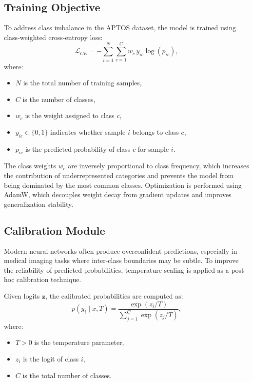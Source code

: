 \documentclass[conference]{IEEEtran}
\begin{document}
\subsection{Training Objective}
To address class imbalance in the APTOS dataset, the model is trained using class-weighted cross-entropy loss:
\begin{equation}
\mathcal{L}_{CE} = - \sum_{i=1}^{N} \sum_{c=1}^{C} w_c \, y_{ic} \log(p_{ic}),
\end{equation}
where:
\begin{itemize}
    \item $N$ is the total number of training samples,
    \item $C$ is the number of classes,
    \item $w_c$ is the weight assigned to class $c$,
    \item $y_{ic} \in \{0,1\}$ indicates whether sample $i$ belongs to class $c$,
    \item $p_{ic}$ is the predicted probability of class $c$ for sample $i$.
\end{itemize}

The class weights $w_c$ are inversely proportional to class frequency, which increases the contribution of underrepresented categories and prevents the model from being dominated by the most common classes. Optimization is performed using AdamW, which decouples weight decay from gradient updates and improves generalization stability.

\subsection{Calibration Module}
Modern neural networks often produce overconfident predictions, especially in medical imaging tasks where inter-class boundaries may be subtle. To improve the reliability of predicted probabilities, temperature scaling is applied as a post-hoc calibration technique.

Given logits $\mathbf{z}$, the calibrated probabilities are computed as:
\begin{equation}
p(y_i \mid x, T) = \frac{\exp(z_i/T)}{\sum_{j=1}^{C}\exp(z_j/T)},
\end{equation}
where:
\begin{itemize}
    \item $T > 0$ is the temperature parameter,
    \item $z_i$ is the logit of class $i$,
    \item $C$ is the total number of classes.
\end{itemize}
\end{document}
